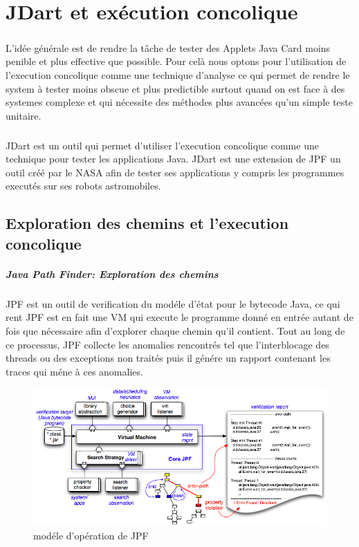 \chapter{JDart et exécution concolique}
  \paragraph{}
    L'idée générale est de rendre la tâche de tester des Applets Java Card moins penible et plus effective que possible.
    Pour celà nous optons pour l'utilisation de l'execution concolique comme une technique d'analyse ce qui permet de rendre 
    le system à tester moins obscue et plus predictible surtout quand on est face à des systemes complexe
    et qui nécessite des méthodes plus avancées qu'un simple teste unitaire.
  \paragraph{}
    JDart est un outil qui permet d'utiliser l'execution concolique comme une technique pour tester les applications Java.
    \newline
    JDart est une extension de \gls{JPF} un outil créé par le NASA afin de tester ses applications y compris les programmes executés sur ses robots astromobiles.
  \section{Exploration des chemins et l'execution concolique}
    \paragraph{Java Path Finder: Exploration des chemins}
      \gls{JPF} est un outil de verification du modéle d'état pour le bytecode Java,
      ce qui rent \gls{JPF} est en fait une \gls{VM} qui execute le programme donné en entrée autant de fois que nécessaire
      afin d'explorer chaque chemin qu'il contient.
      Tout au long de ce processus, \gls{JPF} collecte les anomalies rencontrés tel que l'interblocage des threads ou des exceptions non traités puis
      il génére un rapport contenant les traces qui méne à ces anomalies.
      \begin{figure}
	\centering
	  \includegraphics[width=1\textwidth]{images/jpf-model.png}
	\caption{modéle d'opération de \gls{JPF}}
      \end{figure}
